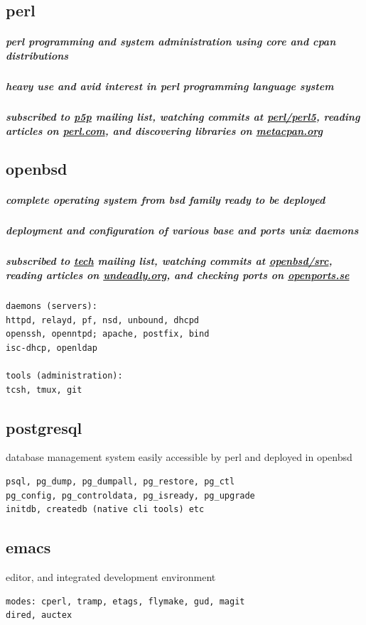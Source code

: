 \documentclass{article}
\begin{document}
\subsection{perl}
\subparagraph{perl programming and system administration using core and cpan distributions}
\subparagraph{heavy use and avid interest in perl programming language system}
\subparagraph{subscribed to \href{https://lists.perl.org/list/perl5-porters.html}{p5p} mailing list, watching commits at \href{https://github.com/Perl/perl5}{perl/perl5}, reading articles on \href{https://perl.com/}{perl.com}, and discovering libraries on \href{https://metacpan.org/}{metacpan.org}}
\subsection{openbsd}
\subparagraph{complete operating system from bsd family ready to be deployed}
\subparagraph{deployment and configuration of various base and ports unix daemons}
\subparagraph{subscribed to \href{https://www.openbsd.org/mail.html}{tech} mailing list, watching commits at \href{https://github.com/openbsd/src}{openbsd/src}, reading articles on \href{https://undeadly.org//}{undeadly.org}, and checking ports on \href{https://openports.se/}{openports.se}}
\begin{verbatim}
daemons (servers):
httpd, relayd, pf, nsd, unbound, dhcpd
openssh, openntpd; apache, postfix, bind
isc-dhcp, openldap

tools (administration):
tcsh, tmux, git
\end{verbatim}
\subsection{postgresql}
database management system easily accessible by perl and deployed in openbsd
\begin{verbatim}
psql, pg_dump, pg_dumpall, pg_restore, pg_ctl
pg_config, pg_controldata, pg_isready, pg_upgrade
initdb, createdb (native cli tools) etc
\end{verbatim}
\subsection{emacs}
editor, and integrated development environment
\begin{verbatim}
modes: cperl, tramp, etags, flymake, gud, magit
dired, auctex
\end{verbatim}
\end{document}
